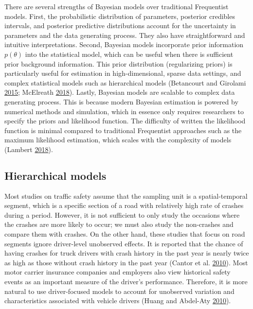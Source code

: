 \documentclass[12pt]{book}
\numberwithin{equation}{chapter}
\begin{document}
There are several strengths of Bayesian models over traditional Frequentist models. First, the probabilistic distribution of parameters, posterior credibles intervals, and posterior predictive distributions account for the uncertainty in parameters and the data generating process. They also have straightforward and intuitive interpretations. Second, Bayesian models incorporate prior information \(p(\theta)\) into the statistical model, which can be useful when there is sufficient prior background information. This prior distribution (regularizing priors) is particularly useful for estimation in high-dimensional, sparse data settings, and complex statistical models such as hierarchical models (Betancourt and Girolami \protect\hyperlink{ref-betancourt2015hamiltonian}{2015}; McElreath \protect\hyperlink{ref-mcelreath2018statistical}{2018}). Lastly, Bayesian models are scalable to complex data generating process. This is because modern Bayesian estimation is powered by numerical methods and simulation, which in essence only requires researchers to specify the priors and likelihood function. The difficulty of written the likelihood function is minimal compared to traditional Frequentist approaches such as the maximum likelihood estimation, which scales with the complexity of models (Lambert \protect\hyperlink{ref-lambert2018student}{2018}).

\hypertarget{hierarchical-models}{%
\subsection{Hierarchical models}\label{hierarchical-models}}

Most studies on traffic safety assume that the sampling unit is a spatial-temporal segment, which is a specific section of a road with relatively high rate of crashes during a period. However, it is not sufficient to only study the occasions where the crashes are more likely to occur; we must also study the non-crashes and compare them with crashes. On the other hand, these studies that focus on road segments ignore driver-level unobserved effects. It is reported that the chance of having crashes for truck drivers with crash history in the past year is nearly twice as high as those without crash history in the past year (Cantor et al. \protect\hyperlink{ref-cantor2010driver}{2010}). Most motor carrier insurance companies and employers also view historical safety events as an important measure of the driver's performance. Therefore, it is more natural to use driver-focused models to account for unobserved variation and characteristics associated with vehicle drivers (Huang and Abdel-Aty \protect\hyperlink{ref-huang2010multilevel}{2010}).
\end{document}
